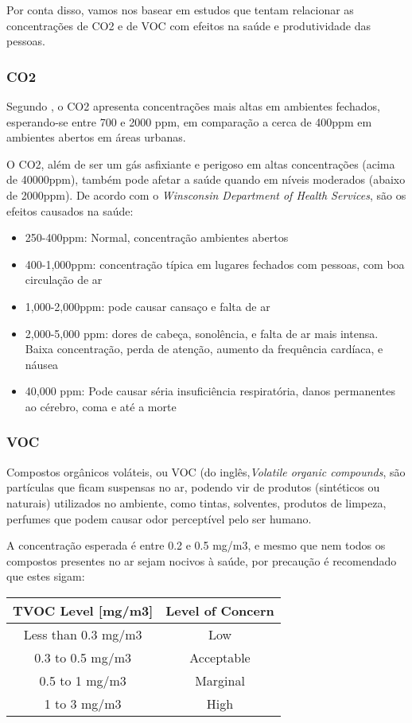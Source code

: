 \documentclass[monografia.tex]{subfiles}
\begin{document}
Por conta disso, vamos nos basear em estudos que tentam relacionar as concentrações de CO2 e de VOC com efeitos na saúde e produtividade das pessoas. 

\subsubsection{CO2}
Segundo \cite{AirQuality}, o CO2 apresenta concentrações mais altas em ambientes fechados, esperando-se entre 700 e 2000 ppm, em comparação a cerca de 400ppm em ambientes abertos em áreas urbanas\cite{co2Earth}. 

O CO2, além de ser um gás asfixiante e perigoso em altas concentrações (acima de 40000ppm), também pode afetar a saúde quando em níveis moderados (abaixo de 2000ppm). 
De acordo com o \textit{Winsconsin Department of Health Services}\cite{Winsconsin}, são os efeitos causados na saúde: 
\begin{itemize}
\item 250-400ppm: Normal, concentração ambientes abertos
\item 400-1,000ppm: concentração típica em lugares fechados com pessoas, com boa circulação de ar
\item 1,000-2,000ppm: pode causar cansaço e falta de ar
\item 2,000-5,000 ppm: dores de cabeça, sonolência, e falta de ar mais intensa. Baixa concentração, perda de atenção, aumento da frequência cardíaca, e náusea
\item 40,000 ppm: Pode causar séria insuficiência respiratória, danos permanentes ao cérebro, coma e até a morte
\end{itemize}

\subsubsection{VOC}
Compostos orgânicos voláteis, ou VOC (do inglês,\textit{Volatile organic compounds}, são partículas que ficam suspensas no ar, podendo vir de produtos (sintéticos ou naturais) utilizados no ambiente, como tintas, solventes, produtos de limpeza, perfumes que podem causar odor perceptível pelo ser humano\cite{AirQuality}.

A concentração esperada é entre 0.2 e 0.5 mg/m3, e mesmo que nem todos os compostos presentes no ar sejam nocivos à saúde, por precaução é recomendado que estes sigam: \cite{tecam}

\begin{tabular}{ |c|c| }
\hline
TVOC Level [mg/m3]	&   Level of Concern \\
\hline
Less than 0.3 mg/m3	 &  Low \\
0.3 to 0.5 mg/m3	&   Acceptable \\
0.5 to 1 mg/m3	 &  Marginal \\
1 to 3 mg/m3	 &  High \\
\hline
\end{tabular}
\end{document}
